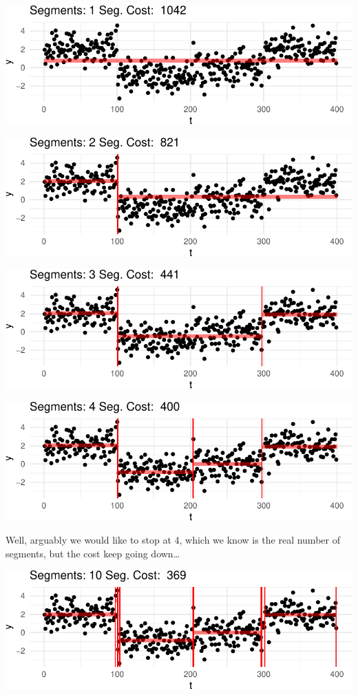 \documentclass[
  letterpaper,
  DIV=11,
  numbers=noendperiod]{scrreprt}
\begin{document}
\includegraphics{3_multiple_changes_files/figure-pdf/unnamed-chunk-5-1.pdf}

\includegraphics{3_multiple_changes_files/figure-pdf/unnamed-chunk-5-2.pdf}

\includegraphics{3_multiple_changes_files/figure-pdf/unnamed-chunk-5-3.pdf}

\includegraphics{3_multiple_changes_files/figure-pdf/unnamed-chunk-5-4.pdf}

Well, arguably we would like to stop at 4, which we know is the real
number of segments, but the cost keep going down\ldots{}

\includegraphics{3_multiple_changes_files/figure-pdf/unnamed-chunk-6-1.pdf}
\end{document}
